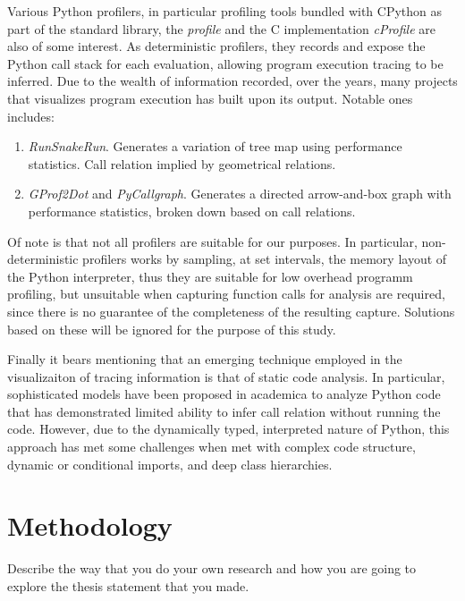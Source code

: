 \documentclass[conference]{IEEEtran}
\begin{document}
Various Python profilers, in particular profiling tools bundled with CPython as part of the standard library, the \textit{profile} and the C implementation \textit{cProfile} are also of some interest. As deterministic profilers, they records and expose the Python call stack for each evaluation, allowing program execution tracing to be inferred. Due to the wealth of information recorded, over the years, many projects that visualizes program execution has built upon its output. Notable ones includes: \par
\begin{enumerate}
    \item \textit{RunSnakeRun}. Generates a variation of tree map using performance statistics. Call relation implied by geometrical relations.
    \item \textit{GProf2Dot} and \textit{PyCallgraph}. Generates a directed arrow-and-box graph with performance statistics, broken down based on call relations.
\end{enumerate}
Of note is that not all profilers are suitable for our purposes. In particular, non-deterministic profilers works by sampling, at set intervals, the memory layout of the Python interpreter, thus they are suitable for low overhead programm profiling, but unsuitable when capturing function calls for analysis are required, since there is no guarantee of the completeness of the resulting capture. Solutions based on these will be ignored for the purpose of this study.\par


Finally it bears mentioning that an emerging technique employed in the visualizaiton of tracing information is that of %
static code analysis. In particular, sophisticated models have been proposed in academica to analyze Python code that has demonstrated limited ability to infer call relation without running the code. However, due to the dynamically typed, interpreted nature of Python, this approach has met some challenges when met with complex code structure, dynamic or conditional imports, and deep class hierarchies. \par


\section{Methodology}
Describe the way that you do your own research and how you are going to explore the thesis statement that you made. 
\end{document}
